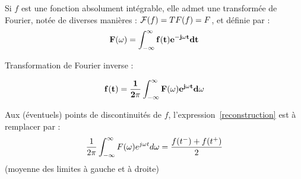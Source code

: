 \begin{boxedminipage}{15cm}
\begin{definition}

Si $f$ est une fonction absolument intégrable, elle admet une transformée de Fourier, notée de diverses manières : ${\cal F}(f)=TF(f)=F$, et définie par :
\begin{equation}
{\bf F(\omega)=\int_{-\infty}^{\infty}f(t)e^{-j\omega t}dt}
\end{equation}

Transformation de Fourier inverse :

 \begin{equation}
{\bf f(t)=\frac{1}{2\pi}\int_{-\infty}^{\infty}F(\omega)e^{j\omega t}d\omega}
\label{reconstruction}
\end{equation}

\begin{remark}
Aux (éventuels) points de discontinuités de $f$, l'expression~\ref{reconstruction} est à remplacer par : 
 \begin{equation}
\frac{1}{2\pi}\int_{-\infty}^{\infty} F(\omega)e^{j\omega t}d\omega=\frac{f(t^-)+f(t^+)}{2}
\label{reconstruction2}
\end{equation}
(moyenne des limites à gauche et à droite)
\end{remark}
\end{definition}
\end{boxedminipage}

